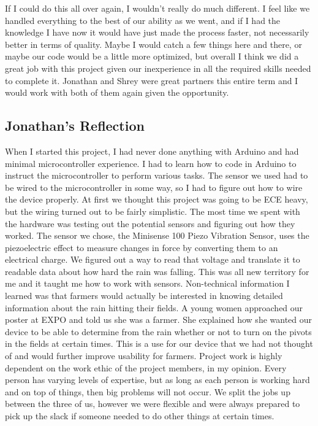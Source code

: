 \documentclass[letterpaper,10pt,draftclsnofoot,onecolumn]{article}
\begin{document}
\newline
\newline
If I could do this all over again, I wouldn’t really do much different. I feel like we handled everything to the best of our ability as we went, and if I had the knowledge I have now it would have just made the process faster, not necessarily better in terms of quality. Maybe I would catch a few things here and there, or maybe our code would be a little more optimized, but overall I think we did a great job with this project given our inexperience in all the required skills needed to complete it. Jonathan and Shrey were great partners this entire term and I would work with both of them again given the opportunity.

\subsection{Jonathan's Reflection}
When I started this project, I had never done anything with Arduino and had minimal microcontroller experience. I had to learn how to code in Arduino to instruct the microcontroller to perform various tasks. The sensor we used had to be wired to the microcontroller in some way, so I had to figure out how to wire the device properly. At first we thought this project was going to be ECE heavy, but the wiring turned out to be fairly simplistic. The most time we spent with the hardware was testing out the potential sensors and figuring out how they worked. The sensor we chose, the Minisense 100 Piezo Vibration Sensor, uses the piezoelectric effect to measure changes in force by converting them to an electrical charge. We figured out a way to read that voltage and translate it to readable data about how hard the rain was falling. This was all new territory for me and it taught me how to work with sensors. 
\newline
\newline
Non-technical information I learned was that farmers would actually be interested in knowing detailed information about the rain hitting their fields. A young women approached our poster at EXPO and told us she was a farmer. She explained how she wanted our device to be able to determine from the rain whether or not to turn on the pivots in the fields at certain times. This is a use for our device that we had not thought of and would further improve usability for farmers.
\newline
\newline
Project work is highly dependent on the work ethic of the project members, in my opinion. Every person has varying levels of expertise, but as long as each person is working hard and on top of things, then big problems will not occur. We split the jobs up between the three of us, however we were flexible and were always prepared to pick up the slack if someone needed to do other things at certain times.
\end{document}
